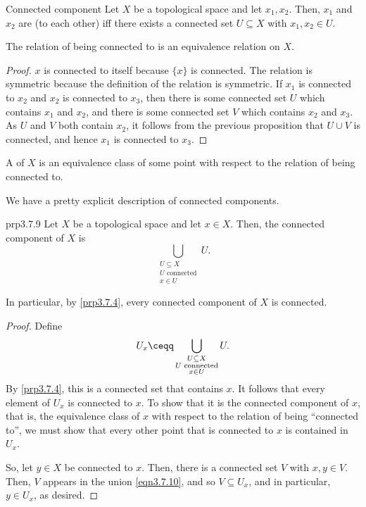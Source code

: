 \begin{dfn}{Connected component}{}
Let $X$ be a topological space and let $x_1,x_2$.  Then, $x_1$ and $x_2$ are  (to each other) iff there exists a connected set $U\subseteq X$ with $x_1,x_2\in U$.
\begin{prp}[breakable=false]{}{}
The relation of being connected to is an equivalence relation on $X$.
\begin{proof}
$x$ is connected to itself because $\{ x\}$ is connected.  The relation is symmetric because the definition of the relation is symmetric.  If $x_1$ is connected to $x_2$ and $x_2$ is connected to $x_3$, then there is some connected set $U$ which contains $x_1$ and $x_2$, and there is some connected set $V$ which contains $x_2$ and $x_3$.  As $U$ and $V$ both contain $x_2$, it follows from the previous proposition that $U\cup V$ is connected, and hence $x_1$ is connected to $x_3$.
\end{proof}
\end{prp}
A  of $X$ is an equivalence class of some point with respect to the relation of being connected to.
\end{dfn}
We have a pretty explicit description of connected components.
\begin{prp}{}{prp3.7.9}
Let $X$ be a topological space and let $x\in X$.  Then, the connected component of $X$ is
\begin{equation}
\bigcup _{\substack{U\subseteq X \\ U\text{ connected} \\ x\in U}}U.
\end{equation}
\begin{rmk}
In particular, by \cref{prp3.7.4}, every connected component of $X$ is connected.
\end{rmk}
\begin{proof}
Define
\begin{equation}\label{eqn3.7.10}
U_x\ceqq \bigcup _{\substack{U\subseteq X \\ U\text{ connected} \\ x\in U}}U.
\end{equation}
By \cref{prp3.7.4}, this is a connected set that contains $x$.  It follows that every element of $U_x$ is connected to $x$.  To show that it is the connected component of $x$, that is, the equivalence class of $x$ with respect to the relation of being ``connected to'', we must show that every other point that is connected to $x$ is contained in $U_x$.

So, let $y\in X$ be connected to $x$.  Then, there is a connected set $V$ with $x,y\in V$.  Then, $V$ appears in the union \eqref{eqn3.7.10}, and so $V\subseteq U_x$, and in particular, $y\in U_x$, as desired.
\end{proof}
\end{prp}
